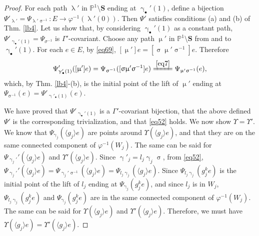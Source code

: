 \documentclass[12pt,a4paper,notitlepage]{article}
\theoremstyle{definition}
\theoremstyle{plain}
\newcommand{\bk}[1]{\langle {#1}\rangle}
\newcommand{\blt}{\bullet}
\newcommand{\Pbb}{\mathbb P}
\newcommand{\Sbf}{\mathbf{S}}
\numberwithin{equation}{subsection}
\begin{document}
\begin{proof}
For each path $\uplambda'$ in $\Pbb^1\setminus\Sbf$ ending at $\upgamma_\blt'(1)$, define a bijection $\Psi'_{\uplambda'}=\Psi_{\uplambda'\upsigma^{-1}}:E\rightarrow \varphi^{-1}(\uplambda'(0))$. Then $\Psi'$ satisfies conditions (a) and (b) of Thm. \ref{lb4}. Let us show that, by considering $\upgamma_\blt'(1)$ as a constant path, $\Psi'_{\upgamma_\blt'(1)}=\Psi_{\sigma^{-1}}$ is $\Gamma'$-covariant. Choose any path $\upmu'$ in $\Pbb^1\setminus\Sbf$ from and to $\upgamma_\blt'(1)$. For each $e\in E$, by \eqref{eq69}, $[\upmu']e=[\upsigma\upmu'\upsigma^{-1}]e$. Therefore
\begin{align*}
\Psi'_{\upgamma'_\blt(1)}([\upmu']e)=\Psi_{\upsigma^{-1}}([\upsigma\upmu'\upsigma^{-1}]e)\xlongequal{\eqref{eq7}} \Psi_{\upmu'\upsigma^{-1}}(e),
\end{align*}
which, by Thm. \ref{lb4}-(b), is the initial point of the lift of $\upmu'$ ending at 	$\Psi_{\upsigma^{-1}}(e)=\Psi'_{\upgamma'_\blt(1)}(e)$.


We have proved that $\Psi'_{\upgamma_\blt'(1)}$ is a $\Gamma'$-covariant bijection,  that the above defined $\Psi'$ is the corresponding trivialization, and that \eqref{eq52} holds. We now show $\Upsilon=\Upsilon'$. We know that $\Psi_{\upgamma_j}(\bk{g_j}e)$ are points around $\Upsilon(\bk{g_j}e)$, and that they are on the same connected component of $\varphi^{-1}(W_j)$. The same can be said for $\Psi_{\upgamma_j'}'(\bk{g_j}e)$ and $\Upsilon'(\bk{g_j}e)$. Since $\upgamma'_j=l_j\upgamma_j\upsigma$, from \eqref{eq52}, $\Psi_{\upgamma_j'}'(\bk{g_j}e)=\Psi_{\upgamma_j'\upsigma^{-1}}(\bk{g_j}e)=\Psi_{l_j\upgamma_j}(\bk{g_j}e)$.  Since $\Psi_{l_j\upgamma_j}(g_j^ke)$ is the initial point of the lift of $l_j$ ending at $\Psi_{\upgamma_j}(g_j^ke)$, and since $l_j$ is in $W_j$, $\Psi_{l_j\upgamma_j}(g_j^ke)$ and $\Psi_{\upgamma_j}(g_j^ke)$ are in the same connected component of  $\varphi^{-1}(W_j)$. The same can be said for $\Upsilon(\bk{g_j}e)$ and $\Upsilon'(\bk{g_j}e)$. Therefore, we must have $\Upsilon(\bk{g_j}e)=\Upsilon'(\bk{g_j}e)$. 
\end{proof}
\end{document}
